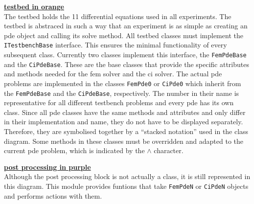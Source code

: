 \documentclass[./\jobname.tex]{subfiles}
\begin{document}
\textcolor{testbed_colour}{\large \underline{\textbf{testbed in orange}}} \\
The testbed holds the 11 differential equations used in all experiments. The testbed is abstraced in such a way that an experiment is as simple as creating an \gls{pde} object and calling its solve method. All testbed classes must implement the \colorbox{light-gray}{\lstinline[basicstyle=\ttfamily\color{black}]|ITestbenchBase|} interface. This ensures the minimal functionality of every subsequent class. Currently two classes implement this interface, the \colorbox{light-gray}{\lstinline[basicstyle=\ttfamily\color{black}]|FemPdeBase|} and the \colorbox{light-gray}{\lstinline[basicstyle=\ttfamily\color{black}]|CiPdeBase|}. These are the base classes that provide the specific attributes and methods needed for the \gls{fem} solver and the \gls{ci} solver. The actual \gls{pde} problems are implemented in the classes \colorbox{light-gray}{\lstinline[basicstyle=\ttfamily\color{black}]|FemPde0|} or \colorbox{light-gray}{\lstinline[basicstyle=\ttfamily\color{black}]|CiPde0|} which inherit from the \colorbox{light-gray}{\lstinline[basicstyle=\ttfamily\color{black}]|FemPdeBase|} and the \colorbox{light-gray}{\lstinline[basicstyle=\ttfamily\color{black}]|CiPdeBase|}, respectively. The number in their name is representative for all different testbench problems and every \gls{pde} has its own class. Since all \gls{pde} classes have the same methods and attributes and only differ in their implementation and name, they do not have to be displayed separately. Therefore, they are symbolised together by a ``stacked notation'' used in the class diagram. Some methods in these classes must be overridden and adapted to the current \gls{pde} problem, which is indicated by the $\land$ character.

\textcolor{post_proc_colour}{\large \underline{\textbf{post processing in purple}}} \\
Although the post processing block is not actually a class, it is still represented in this diagram. This module provides funtions that take \colorbox{light-gray}{\lstinline[basicstyle=\ttfamily\color{black}]|FemPdeN|} or \colorbox{light-gray}{\lstinline[basicstyle=\ttfamily\color{black}]|CiPdeN|} objects and performs actions with them. 
\end{document}
